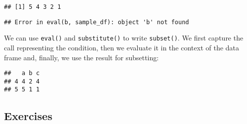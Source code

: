 \begin{Shaded}
\begin{Highlighting}[]
\NormalTok{(}
\end{Highlighting}
\end{Shaded}

\begin{verbatim}
## [1] 5 4 3 2 1
\end{verbatim}

\begin{Shaded}
\begin{Highlighting}[]
\end{Highlighting}
\end{Shaded}

\begin{verbatim}
## Error in eval(b, sample_df): object 'b' not found
\end{verbatim}

We can use \texttt{eval()} and \texttt{substitute()} to write
\texttt{subset()}. We first capture the call representing the condition,
then we evaluate it in the context of the data frame and, finally, we
use the result for subsetting:

\begin{Shaded}
\begin{Highlighting}[]
\StringTok{ }
\StringTok{ }
\StringTok{ }
\NormalTok{\}}
\OperatorTok{>=}\StringTok{ }\NormalTok{)}
\end{Highlighting}
\end{Shaded}

\begin{verbatim}
##   a b c
## 4 4 2 4
## 5 5 1 1
\end{verbatim}

\hypertarget{exercises-1}{%
\subsection{Exercises}\label{exercises-1}}

